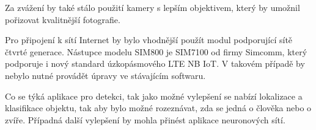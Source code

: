 Za zvážení by také stálo použití kamery s lepším objektivem, který by umožnil pořizovat kvalitnější fotografie.

Pro připojení k sítí Internet by bylo vhodnější použít modul podporující sítě čtvrté generace. Nástupce modelu SIM800 je SIM7100 od firmy Simcomm, který podporuje i nový standard úzkopásmového LTE NB IoT. V takovém případě by nebylo nutné provádět úpravy ve stávajícím softwaru.

Co se týká aplikace pro detekci, tak jako možné vylepšení se nabízí lokalizace a klasifikace objektu, tak aby bylo možné rozeznávat, zda se jedná o člověka nebo o zvíře. Případná další vylepšení by mohla přinést aplikace neuronových sítí.





